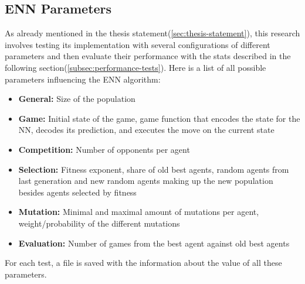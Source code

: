 \subsection{ENN Parameters}\label{subsec:enn-parameters}
As already mentioned in the thesis statement(\ref{sec:thesis-statement}), this research involves testing its implementation with several configurations of different parameters and then evaluate their performance with the stats described in the following section(\ref{subsec:performance-tests}).
Here is a list of all possible parameters influencing the ENN algorithm:
\begin{itemize}
    \item \textbf{General:} Size of the population
    \item \textbf{Game:} Initial state of the game, game function that encodes the state for the NN, decodes its prediction, and executes the move on the current state
    \item \textbf{Competition:} Number of opponents per agent
    \item \textbf{Selection:} Fitness exponent, share of old best agents, random agents from last generation and new random agents making up the new population besides agents selected by fitness
    \item \textbf{Mutation:} Minimal and maximal amount of mutations per agent, weight/probability of the different mutations
    \item \textbf{Evaluation:} Number of games from the best agent against old best agents

\end{itemize}
For each test, a file is saved with the information about the value of all these parameters.

